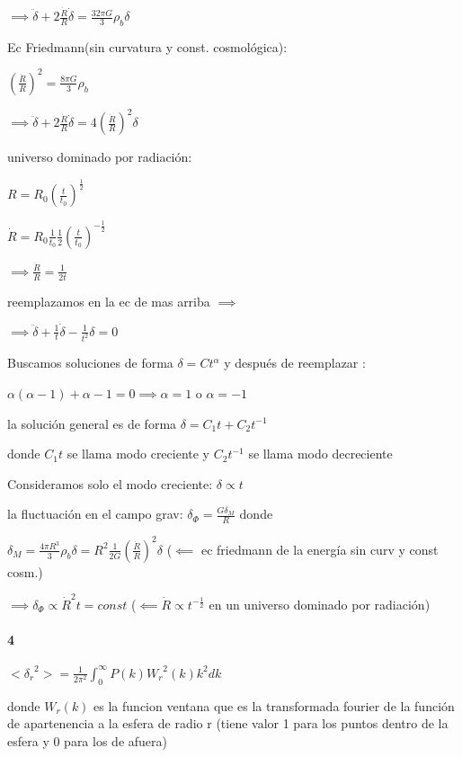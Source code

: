 \documentclass[12pt]{book}
\begin{document}
$\implies  \ddot{\delta} + 2  \frac{\dot{R}}{R} \dot{\delta} =  \frac{32 \pi G}{3}  \rho_b \delta $

Ec Friedmann(sin curvatura y const. cosmológica):

$(\frac{\dot{R}}{R})^2 = \frac{8 \pi G }{3} \rho_b$

$\implies \ddot{\delta} + 2  \frac{\dot{R}}{R} \dot{\delta}  = 4 (\frac{\dot{R}}{R})^2 \delta$

universo dominado por radiación:

$R=R_0(\frac{t}{t_0})^{\frac{1}{2}}$

$\dot{R}=R_0\frac{1}{t_0}\frac{1}{2} (\frac{t}{t_0})^{-\frac{1}{2}}$

$\implies \frac{\dot{R}}{R} = \frac{1}{2t}$

reemplazamos en la ec de mas  arriba $\implies$

$\implies \ddot{\delta} +   \frac{1}{t} \dot{\delta}  -  \frac{1}{t^2} \delta = 0$

Buscamos soluciones de forma $\delta = C t^{\alpha}$ y después de reemplazar :

$\alpha(\alpha-1) + \alpha -1 = 0 \implies \alpha = 1$ o $\alpha = -1$

la solución general es de forma $\delta = C_1 t + C_2 t^{-1}$ 

donde $C_1 t $ se llama modo creciente y $ C_2 t^{-1}$ se llama modo decreciente

Consideramos solo el modo creciente: $\delta \propto  t$

la fluctuación en el campo grav:  $\delta_{\Phi} = \frac{G \delta_{M}}{R}$ donde

$\delta_M = \frac{4 \pi R^3}{3} \rho_b \delta = R^2 \frac{1}{2 G } (\frac{\dot{R}}{R})^2 \delta $ ($\impliedby $ ec friedmann de la energía sin curv y const cosm.)

$\implies \delta_{\Phi} \propto \dot{R}^2 t = const$ ($\impliedby \dot{R} \propto t^{-\frac{1}{2}}$ en un universo dominado por radiación)

\paragraph{4}

$<{\delta_r}^2> = \frac{1}{2\pi^2}\int_0^\infty{P(k){W_r}^2(k) k^2 dk }$

donde $W_r(k)$ es la funcion ventana que es la transformada fourier de la función de apartenencia a la esfera de radio r (tiene valor 1 para los puntos dentro de la esfera y 0 para los de afuera)
\end{document}
